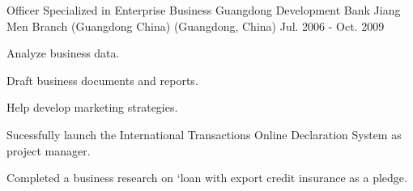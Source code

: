 \documentclass[11pt, a4paper]{awesome-cv} %
\begin{document}
\begin{cventries}
		
	\cventry
	{Officer Specialized in Enterprise Business} %
	{Guangdong Development Bank Jiang Men Branch (Guangdong China)} %
	{(Guangdong, China)} %
	{Jul. 2006 - Oct. 2009} %
	{ %
		\begin{cvitems}
				\item {Analyze business data.}
				\item {Draft business documents and reports.}
				\item {Help develop marketing strategies.}
				\item {Sucessfully launch the International Transactions Online Declaration System as project manager.}
				\item {Completed a business research on ‘loan with export credit insurance as a pledge.}
		\end{cvitems}
	}
		
		
		
	
	
\end{cventries}

%

\end{document}
